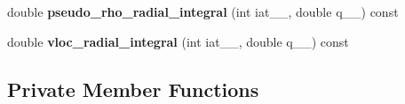\begin{DoxyCompactItemize}
\item 
\hypertarget{classsirius_1_1_radial__integrals_ad8443a43a755f8c6e839b160d2f3b383}{}double {\bfseries pseudo\+\_\+rho\+\_\+radial\+\_\+integral} (int iat\+\_\+\+\_\+, double q\+\_\+\+\_\+) const \label{classsirius_1_1_radial__integrals_ad8443a43a755f8c6e839b160d2f3b383}

\item 
\hypertarget{classsirius_1_1_radial__integrals_acbcac273d57191802c0f792812d0a487}{}double {\bfseries vloc\+\_\+radial\+\_\+integral} (int iat\+\_\+\+\_\+, double q\+\_\+\+\_\+) const \label{classsirius_1_1_radial__integrals_acbcac273d57191802c0f792812d0a487}

\end{DoxyCompactItemize}
\subsection*{Private Member Functions}
